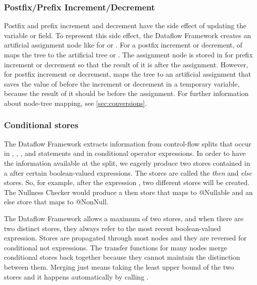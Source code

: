 \subsubsection{Postfix/Prefix Increment/Decrement}
\label{sec:postpre-incdec}
Postfix and prefix increment and decrement have the side effect of
updating the variable or field. To represent this side effect, the Dataflow
Framework creates an artificial assignment node like 
for  or . For a postfix increment or decrement,
 of  maps the tree to the
artificial tree  or . The assignment
node is stored in  for prefix increment or decrement
so that the result of it is after the assignment. However, for postfix
increment or decrement,  maps the tree to an artificial
assignment that saves the value of  before the increment or decrement
in a temporary variable, because the result of it should be before the
assignment. For further information
about node-tree mapping, see \autoref{sec:conversions}.

\subsubsection{Conditional stores}
\label{sec:cond-stores}

The Dataflow Framework extracts information from control-flow splits
that occur in , , , and 
statements and in conditional operator expressions.  In order to have
the information available at the split, we eagerly produce two stores
contained in a  after certain
boolean-valued expressions.  The stores are called the \emph{then} and
\emph{else} stores.  So, for example, after the expression , two different stores will be created.  The Nullness Checker
would produce a then store that maps  to @Nullable and an else
store that maps  to @NonNull.

The Dataflow Framework allows a maximum of two stores, and when there
are two distinct stores, they always refer to the most recent
boolean-valued expression.  Stores are propagated through most nodes
and they are reversed for conditional not expressions.  The transfer
functions for many nodes merge conditional stores back together
because they cannot maintain the distinction between them.  Merging
just means taking the least upper bound of the two stores and it
happens automatically by calling .

